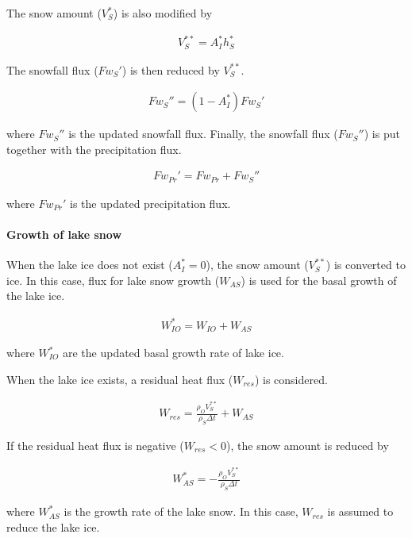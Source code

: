 The snow amount (\(V_S^\ast\)) is also modified by

\begin{eqnarray}
    V_S^{\ast\ast} = A_I^\ast h_S^\ast
\end{eqnarray}

The snowfall flux (\(Fw_S'\)) is then reduced by \(V_S^{\ast\ast}\).

\begin{eqnarray}
    Fw_S'' = (1-A_I^\ast) Fw_S'
\end{eqnarray}

where \(Fw_S''\) is the updated snowfall flux. Finally, the snowfall flux (\(Fw_S''\)) is put together with the precipitation flux.

\begin{eqnarray}
    Fw_{Pr}' = Fw_{Pr} + Fw_S''
\end{eqnarray}

where \(Fw_{Pr}'\) is the updated precipitation flux.

\paragraph{Growth of lake snow}\label{growth-of-lake-snow}

When the lake ice does not exist (\(A_I^\ast=0\)), the snow amount (\(V_S^{\ast\ast}\)) is converted to ice. In this case, flux for lake snow growth (\(W_{AS}\)) is used for the basal growth of the
lake ice.

\begin{eqnarray}
 W_{IO}^\ast = W_{IO} + W_{AS}
\end{eqnarray}

where \(W_{IO}^\ast\) are the updated basal growth rate of lake ice.

When the lake ice exists, a residual heat flux (\(W_{res}\)) is considered.

\begin{eqnarray}
    W_{res} = \frac{\rho_OV_S^{\ast\ast}}{\rho_S \Delta t}+ W_{AS}
\end{eqnarray}

If the residual heat flux is negative (\(W_{res}<0\)), the snow amount is reduced by

\begin{eqnarray}
    W_{AS}^\ast = - \frac{\rho_O V_S^{\ast\ast}}{\rho_S \Delta t}
\end{eqnarray}

where \(W_{AS}^\ast\) is the growth rate of the lake snow. In this case, \(W_{res}\) is assumed to reduce the lake ice.

